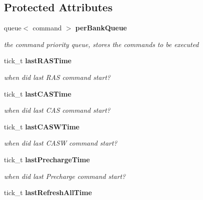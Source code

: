 \subsection*{Protected Attributes}
\begin{CompactItemize}
\item 
queue$<$ command $>$ {\bf perBankQueue}\label{class_d_r_a_m_sim_i_i_1_1bank__c_280594b2e337a689bcf77e18cb9705e8}

\begin{CompactList}\small\item\em the command priority queue, stores the commands to be executed \item\end{CompactList}\item 
tick\_\-t {\bf lastRASTime}\label{class_d_r_a_m_sim_i_i_1_1bank__c_4173fcfc3213d56297ab14d989e82696}

\begin{CompactList}\small\item\em when did last RAS command start? \item\end{CompactList}\item 
tick\_\-t {\bf lastCASTime}\label{class_d_r_a_m_sim_i_i_1_1bank__c_ff351bc5e81de552fce6221be1a75bad}

\begin{CompactList}\small\item\em when did last CAS command start? \item\end{CompactList}\item 
tick\_\-t {\bf lastCASWTime}\label{class_d_r_a_m_sim_i_i_1_1bank__c_759da64105cd2d0206c3d9335a8c693a}

\begin{CompactList}\small\item\em when did last CASW command start? \item\end{CompactList}\item 
tick\_\-t {\bf lastPrechargeTime}\label{class_d_r_a_m_sim_i_i_1_1bank__c_142ca82233fdcfa625469fdc4d371f85}

\begin{CompactList}\small\item\em when did last Precharge command start? \item\end{CompactList}\item 
tick\_\-t {\bf lastRefreshAllTime}\label{class_d_r_a_m_sim_i_i_1_1bank__c_77f60581dea9b312558966999e43a61d}


\end{CompactItemize}
